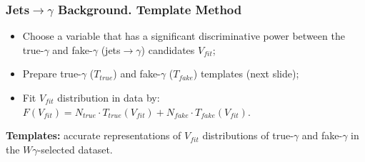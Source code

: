 \begin{frame}\frametitle{Jets$\rightarrow \gamma$ Background. Template Method}
 \tiny
  \begin{itemize}
    \item Choose a variable that has a significant discriminative power between the true-$\gamma$ and fake-$\gamma$ (jets$\rightarrow\gamma$) candidates $V_{fit}$;
    \item Prepare true-$\gamma$ ($T_{true}$) and fake-$\gamma$ ($T_{fake}$) templates {\tiny{(next slide)}};
    \item Fit $V_{fit}$ distribution in data by: $F(V_{fit})=N_{true} \cdot T_{true}(V_{fit}) + N_{fake} \cdot T_{fake}(V_{fit})$.
  \end{itemize}
\tiny
{\bfseries{Templates:}} accurate representations of $V_{fit}$ distributions of true-$\gamma$ and fake-$\gamma$ in the $W\gamma$-selected dataset.\\


\end{frame}
